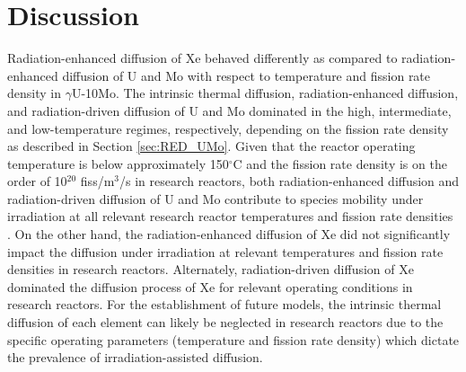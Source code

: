 \documentclass[preprint,12pt]{elsarticle}
\begin{document}
\FloatBarrier

\section{Discussion}
\label{sec:Discussion}
\indent Radiation-enhanced diffusion of Xe behaved differently as compared to radiation-enhanced diffusion of U and Mo with respect to temperature and fission rate density in $\gamma$U-10Mo. The intrinsic thermal diffusion, radiation-enhanced diffusion, and radiation-driven diffusion of U and Mo dominated in the high, intermediate, and low-temperature regimes, respectively, depending on the fission rate density as described in Section \ref{sec:RED_UMo}. Given that the reactor operating temperature is below approximately 150$^{\circ}$C and the fission rate density is on the order of 10$^{20}$ fiss/m$^{3}$/s in research reactors, both radiation-enhanced diffusion and radiation-driven diffusion of U and Mo contribute to species mobility under irradiation at all relevant research reactor temperatures and fission rate densities \cite{meyer2014irradiation, marshall2016new}. On the other hand, the radiation-enhanced diffusion of Xe did not significantly impact the diffusion under irradiation at relevant temperatures and fission rate densities in research reactors. Alternately, radiation-driven diffusion of Xe dominated the diffusion process of Xe for relevant operating conditions in research reactors. For the establishment of future models, the intrinsic thermal diffusion of each element can likely be neglected in research reactors due to the specific operating parameters (temperature and fission rate density) which dictate the prevalence of irradiation-assisted diffusion.
\end{document}
